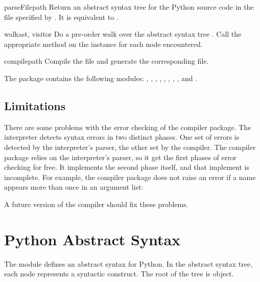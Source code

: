 \documentclass{howto}
\begin{document}
\begin{funcdesc}{parseFile}{path}
Return an abstract syntax tree for the Python source code in the file
specified by .  It is equivalent to
.
\end{funcdesc}

\begin{funcdesc}{walk}{ast, visitor}
Do a pre-order walk over the abstract syntax tree .  Call the
appropriate method on the  instance for each node
encountered.
\end{funcdesc}

\begin{funcdesc}{compile}{path}
Compile the file  and generate the corresponding 
file.
\end{funcdesc}

The  package contains the following modules:
, , ,
, , , ,
, and .

\subsection{Limitations}

There are some problems with the error checking of the compiler
package.  The interpreter detects syntax errors in two distinct
phases.  One set of errors is detected by the interpreter's parser,
the other set by the compiler.  The compiler package relies on the
interpreter's parser, so it get the first phases of error checking for
free.  It implements the second phase itself, and that implement is
incomplete.  For example, the compiler package does not raise an error
if a name appears more than once in an argument list: 

A future version of the compiler should fix these problems.

\section{Python Abstract Syntax}

The  module defines an abstract syntax for
Python.  In the abstract syntax tree, each node represents a syntactic
construct.  The root of the tree is  object.
\end{document}
